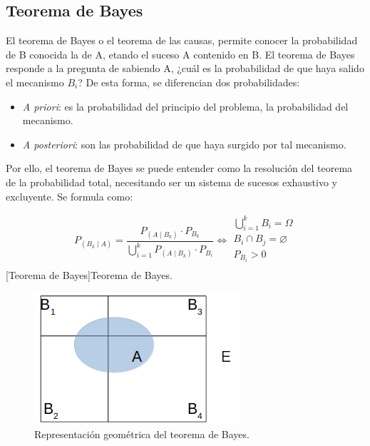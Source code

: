 \subsection{Teorema de Bayes}
El teorema de Bayes o el teorema de las causas, permite conocer la probabilidad de B conocida la de A, etando el suceso A contenido en B. El teorema de Bayes responde a la pregunta de sabiendo A, ¿cuál es la probabilidad de que haya salido el mecanismo $B_i$? De esta forma, se diferencian dos probabilidades:
\begin{itemize}[itemsep=0pt,parsep=0pt,topsep=0pt,partopsep=0pt]
    \item \textit{A priori}: es la probabilidad del principio del problema, la probabilidad del mecanismo.
    \item \textit{A posteriori}: son las probabilidad de que haya surgido por tal mecanismo.
\end{itemize}
Por ello, el teorema de Bayes se puede entender como la resolución del teorema de la probabilidad total, necesitando ser un sistema de sucesos exhaustivo y excluyente. Se formula como:
\begin{multicols}{2}
    \begin{center}
        \begin{equation}
            P_{\left( B_k\mid A\right) } = \dfrac{P_{\left( A\mid B_k \right) }\cdot P_{B_k}}{\bigcup_{i=1}^k P_{\left( A\mid B_k\right)} \cdot P_{B_i}} \iff
                \begin{array}{c}
                    \bigcup_{i=1}^k B_i = \Omega\\
                    B_i \cap B_j = \varnothing \\
                    P_{B_i} > 0 \\
                \end{array}
        \end{equation}
        [Teorema de Bayes]{Teorema de Bayes.}
    \end{center}
    \columnbreak
    \begin{figure}[H]
        \includegraphics[width=0.51\columnwidth]{A.imagenes/ACV-BioSan-Estat-Bayes.png}
        \caption[Representación geométrica del teorema de Bayes]{Representación geométrica del teorema de Bayes.}
    \end{figure}
\end{multicols}
